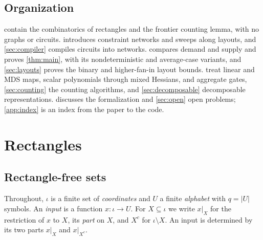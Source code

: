 \documentclass[11pt]{article}
\newcommand{\leanrefs}[1]{{\unskip\nobreak\hfil\penalty50\hskip1em\null\nobreak\hfil
  {\normalfont\small #1}\parfillskip=0pt\finalhyphendemerits=0\par}}
\newcommand{\leanref}[1]{\leanrefs{\lean{#1}}}
\theoremstyle{plain}
\theoremstyle{definition}
\theoremstyle{remark}
\newcommand{\rect}{\mathcal{R}}
\newcommand{\restr}[2]{#1|_{#2}}
\newcommand{\card}[1]{\lvert #1\rvert}
\begin{document}
\subsection{Organization}

 contain the combinatorics of rectangles and the frontier
counting lemma, with no graphs or circuits.  introduces constraint networks
and sweeps along layouts, and \cref{sec:compiler} compiles circuits into networks.
 compares demand and supply and proves \cref{thm:main}, with its
nondeterministic and average-case variants, and \cref{sec:layouts} proves the binary and
higher-fan-in layout bounds.  treat linear and MDS maps,
scalar polynomials through mixed Hessians, and
aggregate gates, \cref{sec:counting} the counting algorithms, and \cref{sec:decomposable}
decomposable representations.  discusses the formalization and
\cref{sec:open} open problems; \cref{app:index} is an index from the paper to the code.

\section{Rectangles}
\label{sec:rectangles}

\subsection{Rectangle-free sets}

Throughout, $\iota$ is a finite set of \emph{coordinates} and $U$ a finite \emph{alphabet}
with $q = \card U$ symbols. An \emph{input} is a function $x \colon \iota \to U$. For
$X \subseteq \iota$ we write $\restr{x}{X}$ for the restriction of $x$ to $X$, its
\emph{part} on $X$, and $X^c$ for $\iota \setminus X$. An input is determined by its two parts
$\restr{x}{X}$ and $\restr{x}{X^c}$.


\end{document}
